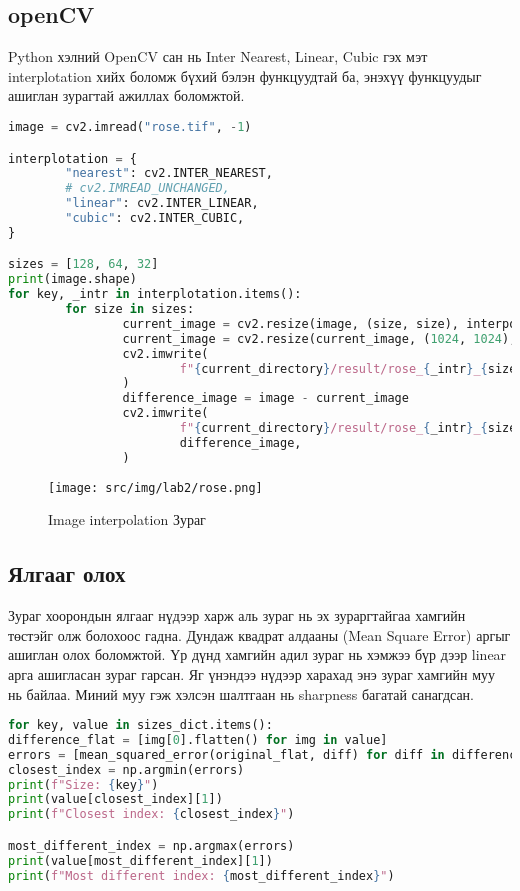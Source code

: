 \subsection{openCV}
Python хэлний OpenCV сан нь Inter Nearest, Linear, Cubic гэх мэт interplotation хийх боломж бүхий бэлэн функцуудтай ба, энэхүү функцуудыг ашиглан зурагтай ажиллах боломжтой. \cite{opencv}

\begin{lstlisting}[language=Python, caption=Image interpolation, frame=single]
image = cv2.imread("rose.tif", -1)

interplotation = {
		"nearest": cv2.INTER_NEAREST,
		# cv2.IMREAD_UNCHANGED,
		"linear": cv2.INTER_LINEAR,
		"cubic": cv2.INTER_CUBIC,
}

sizes = [128, 64, 32]
print(image.shape)
for key, _intr in interplotation.items():
		for size in sizes:
				current_image = cv2.resize(image, (size, size), interpolation=_intr)
				current_image = cv2.resize(current_image, (1024, 1024), interpolation=_intr)
				cv2.imwrite(
						f"{current_directory}/result/rose_{_intr}_{size}_{key}.tif", current_image
				)
				difference_image = image - current_image
				cv2.imwrite(
						f"{current_directory}/result/rose_{_intr}_{size}_{key}_difference.tif",
						difference_image,
				)
\end{lstlisting}

\begin{figure}
	\centering
	\texttt{[image: src/img/lab2/rose.png]}
	\caption{Image interpolation Зураг}
\end{figure}

\subsection{Ялгааг олох}

Зураг хоорондын ялгааг нүдээр харж аль зураг нь эх зураргтайгаа хамгийн төстэйг олж болохоос гадна. Дундаж квадрат алдааны (Mean Square Error) аргыг ашиглан олох боломжтой.\cite{scikit-learn} Үр дүнд хамгийн адил зураг нь хэмжээ бүр дээр linear арга ашигласан зураг гарсан. Яг үнэндээ нүдээр харахад энэ зураг хамгийн муу нь байлаа. Миний муу гэж хэлсэн шалтгаан нь sharpness багатай санагдсан.

\begin{lstlisting}[language=Python, caption=Mean squared error code, frame=single]
for key, value in sizes_dict.items():
difference_flat = [img[0].flatten() for img in value]
errors = [mean_squared_error(original_flat, diff) for diff in difference_flat]
closest_index = np.argmin(errors)
print(f"Size: {key}")
print(value[closest_index][1])
print(f"Closest index: {closest_index}")

most_different_index = np.argmax(errors)
print(value[most_different_index][1])
print(f"Most different index: {most_different_index}")
	\end{lstlisting}

